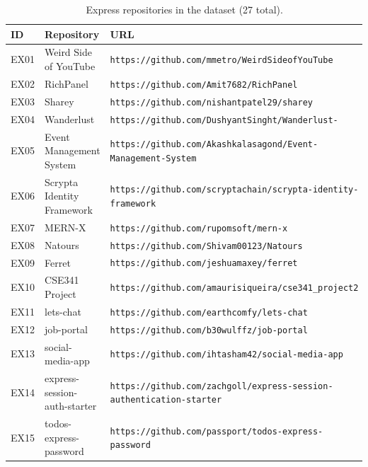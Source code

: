\begin{table}[H]
\centering
\caption{Express repositories in the dataset (27 total).}
\label{tab:dataset-express-full}
\renewcommand{\arraystretch}{1.3}
\small
\begin{tabular}{p{} p{} p{}}
\toprule
\textbf{ID} & \textbf{Repository} & \textbf{URL} \\
\midrule
EX01 & Weird Side of YouTube         & {\small\nolinkurl{https://github.com/mmetro/WeirdSideofYouTube}} \\
EX02 & RichPanel                     & {\small\nolinkurl{https://github.com/Amit7682/RichPanel}} \\
EX03 & Sharey                        & {\small\nolinkurl{https://github.com/nishantpatel29/sharey}} \\
EX04 & Wanderlust                    & {\small\nolinkurl{https://github.com/DushyantSinght/Wanderlust-}} \\
EX05 & Event Management System       & {\small\nolinkurl{https://github.com/Akashkalasagond/Event-Management-System}} \\
EX06 & Scrypta Identity Framework    & {\small\nolinkurl{https://github.com/scryptachain/scrypta-identity-framework}} \\
EX07 & MERN-X                        & {\small\nolinkurl{https://github.com/rupomsoft/mern-x}} \\
EX08 & Natours                       & {\small\nolinkurl{https://github.com/Shivam00123/Natours}} \\
EX09 & Ferret                        & {\small\nolinkurl{https://github.com/jeshuamaxey/ferret}} \\
EX10 & CSE341 Project                & {\small\nolinkurl{https://github.com/amaurisiqueira/cse341_project2}} \\
EX11 & lets-chat                     & {\small\nolinkurl{https://github.com/earthcomfy/lets-chat}} \\
EX12 & job-portal                    & {\small\nolinkurl{https://github.com/b30wulffz/job-portal}} \\
EX13 & social-media-app              & {\small\nolinkurl{https://github.com/ihtasham42/social-media-app}} \\
EX14 & express-session-auth-starter  & {\small\nolinkurl{https://github.com/zachgoll/express-session-authentication-starter}} \\
EX15 & todos-express-password        & {\small\nolinkurl{https://github.com/passport/todos-express-password}} \\

\end{tabular}
\end{table}
